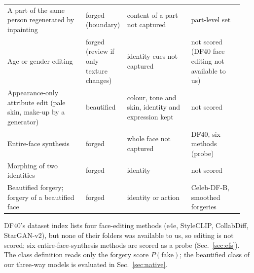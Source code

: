 \documentclass[10pt]{article}
\begin{document}
\begin{table}[H]
\begin{tabular}{@{}>{\raggedright\arraybackslash}p{0.33\linewidth}>{\raggedright\arraybackslash}p{0.13\linewidth}>{\raggedright\arraybackslash}p{0.27\linewidth}>{\raggedright\arraybackslash}p{0.22\linewidth}@{}}
A part of the same person regenerated by inpainting & forged (boundary) & content of a part not captured & part-level set \\
Age or gender editing & forged (review if only texture changes) & identity cues not captured & not scored (DF40 face editing not available to us) \\
Appearance-only attribute edit (pale skin, make-up by a generator) & beautified & colour, tone and skin, identity and expression kept & not scored \\
Entire-face synthesis & forged & whole face not captured & DF40, six methods (probe) \\
Morphing of two identities & forged & identity & not scored \\
Beautified forgery; forgery of a beautified face & forged & identity or action & Celeb-DF-B, smoothed forgeries \\
\bottomrule
\end{tabular}
\end{table}
DF40's dataset index lists four face-editing methods (e4e, StyleCLIP, CollabDiff, StarGAN-v2), but none of their folders was
available to us, so editing is not scored; six entire-face-synthesis methods are scored as a probe (Sec.~\ref{sec:efs}). The class definition reads only the
forgery score $P(\text{fake})$; the beautified class of our three-way models is evaluated in Sec.~\ref{sec:native}.
\end{document}
